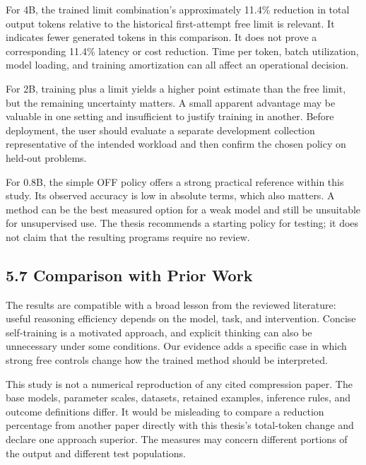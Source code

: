 \documentclass[11pt,letterpaper]{article}
\begin{document}
For 4B, the trained limit combination's approximately 11.4\% reduction in total output tokens relative to the historical first-attempt free limit is relevant. It indicates fewer generated tokens in this comparison. It does not prove a corresponding 11.4\% latency or cost reduction. Time per token, batch utilization, model loading, and training amortization can all affect an operational decision.\par

For 2B, training plus a limit yields a higher point estimate than the free limit, but the remaining uncertainty matters. A small apparent advantage may be valuable in one setting and insufficient to justify training in another. Before deployment, the user should evaluate a separate development collection representative of the intended workload and then confirm the chosen policy on held-out problems.\par

For 0.8B, the simple OFF policy offers a strong practical reference within this study. Its observed accuracy is low in absolute terms, which also matters. A method can be the best measured option for a weak model and still be unsuitable for unsupervised use. The thesis recommends a starting policy for testing; it does not claim that the resulting programs require no review.\par

\subsection*{5.7 Comparison with Prior Work}

The results are compatible with a broad lesson from the reviewed literature: useful reasoning efficiency depends on the model, task, and intervention. Concise self-training is a motivated approach, and explicit thinking can also be unnecessary under some conditions. Our evidence adds a specific case in which strong free controls change how the trained method should be interpreted.\par

This study is not a numerical reproduction of any cited compression paper. The base models, parameter scales, datasets, retained examples, inference rules, and outcome definitions differ. It would be misleading to compare a reduction percentage from another paper directly with this thesis's total-token change and declare one approach superior. The measures may concern different portions of the output and different test populations.\par
\end{document}

